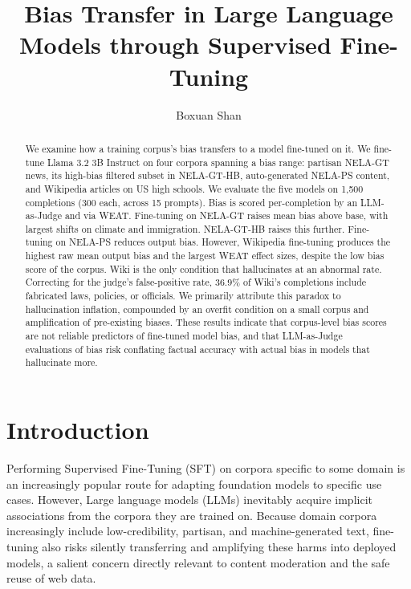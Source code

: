 \documentclass[11pt]{article}
\title{Bias Transfer in Large Language Models through Supervised Fine-Tuning}
\author{Boxuan Shan}
\date{}
\begin{document}
\maketitle

\begin{abstract}

  We examine how a training corpus's bias transfers to a model fine-tuned on it. 
  We fine-tune Llama 3.2 3B Instruct on four corpora spanning a bias range: partisan NELA-GT news, its high-bias filtered subset in NELA-GT-HB, auto-generated NELA-PS content, and Wikipedia articles on US high schools.
  We evaluate the five models on 1{,}500 completions (300 each, across 15 prompts).
  Bias is scored per-completion by an LLM-as-Judge and via WEAT.
  Fine-tuning on NELA-GT raises mean bias above base, with largest shifts on climate and immigration.
  NELA-GT-HB raises this further.
  Fine-tuning on NELA-PS reduces output bias. 
  However, Wikipedia fine-tuning produces the highest raw mean output bias and the largest WEAT effect sizes, despite the low bias score of the corpus.
  Wiki is the only condition that hallucinates at an abnormal rate. 
  Correcting for the judge's false-positive rate, $36.9\%$ of Wiki's completions include fabricated laws, policies, or officials. 
  We primarily attribute this paradox to hallucination inflation, compounded by an overfit condition on a small corpus and amplification of pre-existing biases.
  These results indicate that corpus-level bias scores are not reliable predictors of fine-tuned model bias, and that LLM-as-Judge evaluations of bias risk conflating factual accuracy with actual bias in models that hallucinate more.

\end{abstract}

\section{Introduction}

Performing Supervised Fine-Tuning (SFT) on corpora specific to some domain is an increasingly popular route for adapting foundation models to specific use cases.
However, Large language models (LLMs) inevitably acquire implicit associations from the corpora they are trained on. 
Because domain corpora increasingly include low-credibility, partisan, and machine-generated text, fine-tuning also risks silently transferring and amplifying these harms into deployed models, a salient concern directly relevant to content moderation and the safe reuse of web data.
\end{document}
